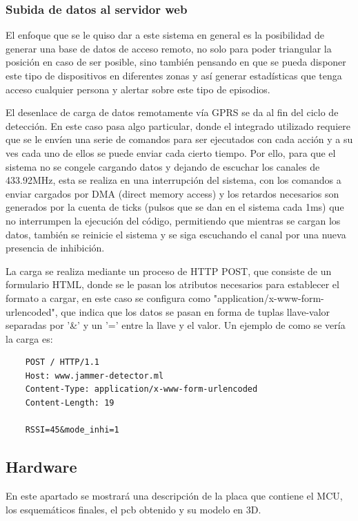 \subsubsection{Subida de datos al servidor web}
\par El enfoque que se le quiso dar a este sistema en general es la posibilidad de generar una base de datos de acceso remoto, no solo para poder triangular la posición en caso de ser posible, sino también pensando en que se pueda disponer este tipo de dispositivos en diferentes zonas y así generar estadísticas que tenga acceso cualquier persona y alertar sobre este tipo de episodios. 
\par El desenlace de carga de datos remotamente vía GPRS se da al fin del ciclo de detección. En este caso pasa algo particular, donde el integrado utilizado requiere que se le envíen una serie de comandos para ser ejecutados con cada acción y a su ves cada uno de ellos se puede enviar cada cierto tiempo. Por ello, para que el sistema no se congele cargando datos y dejando de escuchar los canales de 433.92MHz, esta se realiza en una interrupción del sistema, con los comandos a enviar cargados por DMA (direct memory access) y los retardos necesarios son generados por la cuenta de ticks (pulsos que se dan en el sistema cada 1ms) que no interrumpen la ejecución del código, permitiendo que mientras se cargan los datos, también se reinicie el sistema y se siga escuchando el canal por una nueva presencia de inhibición. 
\par La carga se realiza mediante un proceso de HTTP POST, que consiste de un formulario HTML, donde se le pasan los atributos necesarios para establecer el formato a cargar, en este caso se configura como "application/x-www-form-urlencoded", que indica que los datos se pasan en forma de tuplas llave-valor separadas por '\&' y un '=' entre la llave y el valor. Un ejemplo de como se vería la carga es:
\begin{lstlisting}
    POST / HTTP/1.1 
    Host: www.jammer-detector.ml
    Content-Type: application/x-www-form-urlencoded 
    Content-Length: 19
    
    RSSI=45&mode_inhi=1 
\end{lstlisting}
\subsection{Hardware}
\par En este apartado se mostrará una descripción de la placa que contiene el MCU, los esquemáticos finales, el pcb obtenido y su modelo en 3D. 


